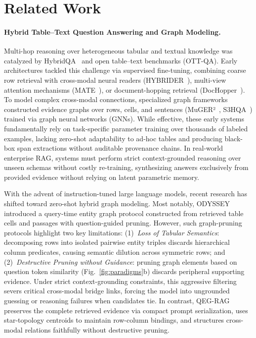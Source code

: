\documentclass[runningheads]{llncs}
\begin{document}
\section{Related Work}
\label{sec:related}



\paragraph{Hybrid Table--Text Question Answering and Graph Modeling.}
Multi-hop reasoning over heterogeneous tabular and textual knowledge was catalyzed by HybridQA~\cite{hybridqa} and open table--text benchmarks (OTT-QA). Early architectures tackled this challenge via supervised fine-tuning, combining coarse row retrieval with cross-modal neural readers (HYBRIDER~\cite{hybridqa}), multi-view attention mechanisms (MATE~\cite{eisenschlos2021mate}), or document-hopping retrieval (DocHopper~\cite{sun2021dochopper}). To model complex cross-modal connections, specialized graph frameworks constructed evidence graphs over rows, cells, and sentences (MuGER²~\cite{wang2022muger2}, S3HQA~\cite{lei2023s3hqa}) trained via graph neural networks (GNNs). While effective, these early systems fundamentally rely on task-specific parameter training over thousands of labeled examples, lacking zero-shot adaptability to ad-hoc tables and producing black-box span extractions without auditable provenance chains. In real-world enterprise RAG, systems must perform strict context-grounded reasoning over unseen schemas without costly re-training, synthesizing answers exclusively from provided evidence without relying on latent parametric memory.

With the advent of instruction-tuned large language models, recent research has shifted toward zero-shot hybrid graph modeling. Most notably, ODYSSEY~\cite{agarwal2025hybrid} introduced a query-time entity graph protocol constructed from retrieved table cells and passages with question-guided pruning. However, such graph-pruning protocols highlight two key limitations: (1)~\emph{Loss of Tabular Semantics}: decomposing rows into isolated pairwise entity triples discards hierarchical column predicates, causing semantic dilution across symmetric rows; and (2)~\emph{Destructive Pruning without Guidance}: pruning graph elements based on question token similarity (Fig.~\ref{fig:paradigms}b) discards peripheral supporting evidence. Under strict context-grounding constraints, this aggressive filtering severs critical cross-modal bridge links, forcing the model into ungrounded guessing or reasoning failures when candidates tie. In contrast, QEG-RAG preserves the complete retrieved evidence via compact prompt serialization, uses star-topology centroids to maintain row-column bindings, and structures cross-modal relations faithfully without destructive pruning.
\end{document}
